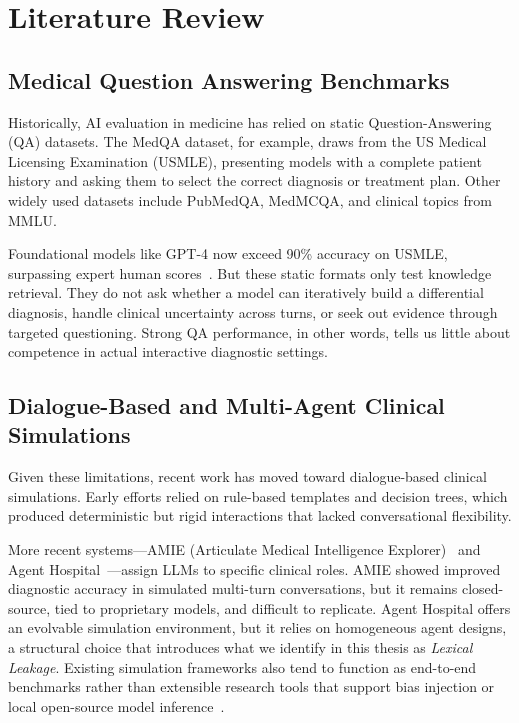 \chapter{Literature Review}
\label{Chapter2}

\section{Medical Question Answering Benchmarks}

Historically, AI evaluation in medicine has relied on static Question-Answering (QA) datasets. The MedQA dataset, for example, draws from the US Medical Licensing Examination (USMLE), presenting models with a complete patient history and asking them to select the correct diagnosis or treatment plan. Other widely used datasets include PubMedQA, MedMCQA, and clinical topics from MMLU.

Foundational models like GPT-4 now exceed 90\% accuracy on USMLE, surpassing expert human scores~\cite{schmidgall2024agentclinic}. But these static formats only test knowledge retrieval. They do not ask whether a model can iteratively build a differential diagnosis, handle clinical uncertainty across turns, or seek out evidence through targeted questioning. Strong QA performance, in other words, tells us little about competence in actual interactive diagnostic settings.

\section{Dialogue-Based and Multi-Agent Clinical Simulations}

Given these limitations, recent work has moved toward dialogue-based clinical simulations. Early efforts relied on rule-based templates and decision trees, which produced deterministic but rigid interactions that lacked conversational flexibility.

More recent systems—AMIE (Articulate Medical Intelligence Explorer)~\cite{tu2024towards} and Agent Hospital~\cite{li2024agenthospital}—assign LLMs to specific clinical roles. AMIE showed improved diagnostic accuracy in simulated multi-turn conversations, but it remains closed-source, tied to proprietary models, and difficult to replicate. Agent Hospital offers an evolvable simulation environment, but it relies on homogeneous agent designs, a structural choice that introduces what we identify in this thesis as \textit{Lexical Leakage}. Existing simulation frameworks also tend to function as end-to-end benchmarks rather than extensible research tools that support bias injection or local open-source model inference~\cite{fan2024aihospital,liao2024automatic}.

